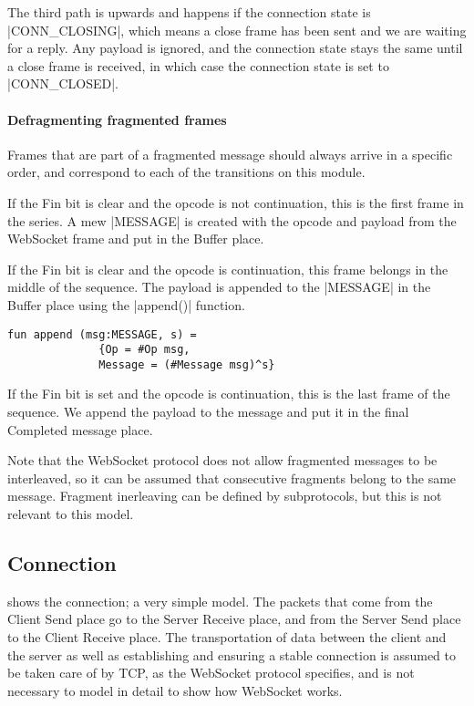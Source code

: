 		The third path is upwards and happens if the connection state is
		|CONN_CLOSING|, which means a close frame has been sent and we are
		waiting for a reply. Any payload is ignored, and the connection state stays
		the same until a close frame is received, in which case the connection state
		is set to |CONN_CLOSED|. 
		
		\paragraph{Defragmenting fragmented frames}
			
			
			Frames that are part of a fragmented message should always arrive in a
			specific order, and correspond to each of the transitions on this module. 
			
			If the Fin bit is clear and the opcode is not continuation, this is the first
			frame in the series. A mew |MESSAGE| is created with the opcode and
			payload from the WebSocket frame and put in the Buffer place.
			
			If the Fin bit is clear and the opcode is continuation, this frame belongs in
			the middle of the sequence. The payload is appended to the
			|MESSAGE| in the Buffer place using the |append()|
			function.
			
			\begin{lstlisting}[label=lst:append,caption=append,gobble=3]
			fun append (msg:MESSAGE, s) = 
			  {Op = #Op msg,
			  Message = (#Message msg)^s}
			\end{lstlisting}
			
			If the Fin bit is set and the opcode is continuation, this is the last frame
			of the sequence. We append the payload to the message and put it in the final
			Completed message place. 
			
			Note that the WebSocket protocol does not allow fragmented messages to be
			interleaved, so it can be assumed that consecutive fragments belong to the
			same message. Fragment inerleaving can be defined by subprotocols, but this
			is not relevant to this model.
			
\subsection{Connection}

	
	 shows the connection; a very simple model. The packets that
	come from the Client Send place go to the Server Receive place, and from the
	Server Send place to the Client Receive place. The transportation of data
	between the client and the server as well as establishing and ensuring a
	stable connection is assumed to be taken care of by TCP, as the WebSocket
	protocol specifies, and is not necessary to model in detail to show how WebSocket works. 
	
